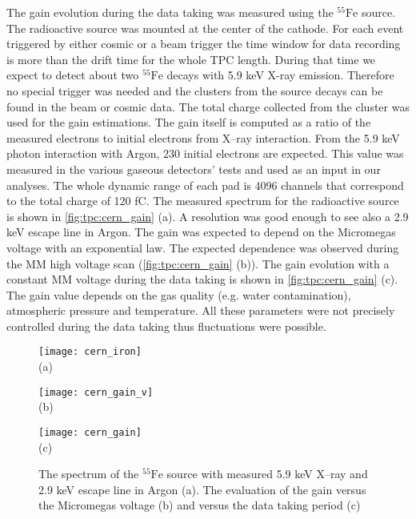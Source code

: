 \documentclass[../main.tex]{subfiles}
\begin{document}
The gain evolution during the data taking was measured using the ${}^{55}\text{Fe}$ source. The radioactive source was mounted at the center of the cathode. For each event triggered by either cosmic or a beam trigger the time window for data recording is more than the drift time for the whole TPC length. During that time we expect to detect about two ${}^{55}\text{Fe}$ decays with 5.9 keV X-ray emission. Therefore no special trigger was needed and the clusters from the source decays can be found in the beam or cosmic data. The total charge collected from the cluster was used for the gain estimations. The gain itself is computed as a ratio of the measured electrons to initial electrons from X--ray interaction. From the 5.9 keV photon interaction with Argon, 230 initial electrons are expected. This value was measured in the various gaseous detectors' tests and used as an input in our analyses. The whole dynamic range of each pad is 4096 channels that correspond to the total charge of 120 fC. The measured spectrum for the radioactive source is shown in \autoref{fig:tpc:cern_gain} (a). A resolution was good enough to see also a 2.9 keV escape line in Argon. The gain was expected to depend on the Micromegas voltage with an exponential law. The expected dependence was observed during the MM high voltage scan (\autoref{fig:tpc:cern_gain} (b)). The gain evolution with a constant MM voltage during the data taking is shown in \autoref{fig:tpc:cern_gain} (c). The gain value depends on the gas quality (e.g. water contamination), atmospheric pressure and temperature. All these parameters were not precisely controlled during the data taking thus fluctuations were possible.

\begin{figure}[!ht]
  \centering
  \begin{minipage}{0.33\linewidth}
    \centering
    \texttt{[image: cern\_iron]} \\ (a)
  \end{minipage}
  \begin{minipage}{0.33\linewidth}
    \centering
    \texttt{[image: cern\_gain\_v]} \\ (b)
  \end{minipage}
  \begin{minipage}{0.33\linewidth}
    \centering
    \texttt{[image: cern\_gain]} \\ (c)
  \end{minipage}
  \caption{The spectrum of the ${}^{55}\text{Fe}$ source with measured 5.9 keV X--ray and 2.9 keV escape line in Argon (a). The evaluation of the gain versus the Micromegas voltage (b) and versus the data taking period (c)}
  \label{fig:tpc:cern_gain}
\end{figure}
\end{document}
